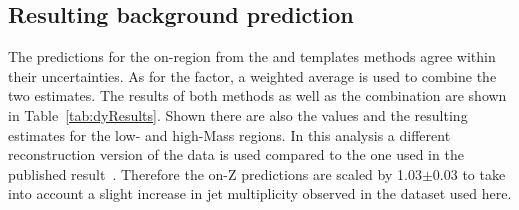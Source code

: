 \subsection{Resulting background prediction}
The predictions for the on-\Z region from the \JZB and \MET templates methods agree within their uncertainties. As for the \Rsfof factor, a weighted average is used to combine the two estimates. The results of both methods as well as the combination are shown in Table~\ref{tab:dyResults}. Shown there are also the \Routin values and the resulting estimates for the low- and high-Mass regions. In this analysis a different reconstruction version of the data is used compared to the one used in the published result~\cite{Khachatryan:2015lwa}. Therefore the on-Z predictions are scaled by 1.03$\pm$0.03 to take into account a slight increase in jet multiplicity observed in the dataset used here.




